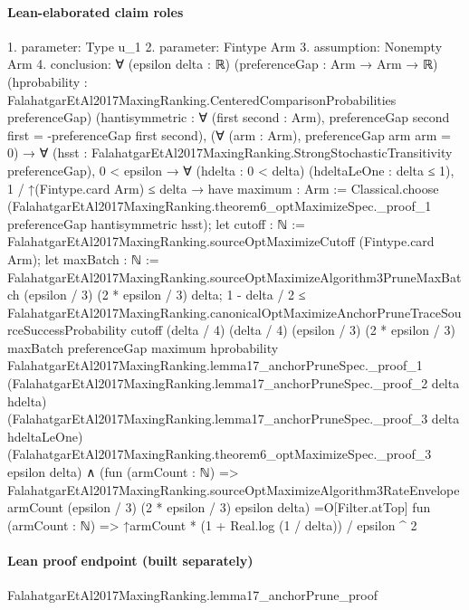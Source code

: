 \documentclass[10pt]{article}
\begin{document}
\paragraph{Lean-elaborated claim roles}\begin{ReviewVerbatim}
1. parameter: Type u_1
2. parameter: Fintype Arm
3. assumption: Nonempty Arm
4. conclusion: ∀ (epsilon delta : ℝ) (preferenceGap : Arm → Arm → ℝ)
  (hprobability : FalahatgarEtAl2017MaxingRanking.CenteredComparisonProbabilities preferenceGap)
  (hantisymmetric : ∀ (first second : Arm), preferenceGap second first = -preferenceGap first second),
  (∀ (arm : Arm), preferenceGap arm arm = 0) →
    ∀ (hsst : FalahatgarEtAl2017MaxingRanking.StrongStochasticTransitivity preferenceGap),
      0 < epsilon →
        ∀ (hdelta : 0 < delta) (hdeltaLeOne : delta ≤ 1),
          1 / ↑(Fintype.card Arm) ≤ delta →
            have maximum : Arm :=
              Classical.choose
                (FalahatgarEtAl2017MaxingRanking.theorem6_optMaximizeSpec._proof_1 preferenceGap hantisymmetric hsst);
            let cutoff : ℕ := FalahatgarEtAl2017MaxingRanking.sourceOptMaximizeCutoff (Fintype.card Arm);
            let maxBatch : ℕ :=
              FalahatgarEtAl2017MaxingRanking.sourceOptMaximizeAlgorithm3PruneMaxBatch (epsilon / 3) (2 * epsilon / 3)
                delta;
            1 - delta / 2 ≤
                FalahatgarEtAl2017MaxingRanking.canonicalOptMaximizeAnchorPruneTraceSourceSuccessProbability cutoff
                  (delta / 4) (delta / 4) (epsilon / 3) (2 * epsilon / 3) maxBatch preferenceGap maximum hprobability
                  FalahatgarEtAl2017MaxingRanking.lemma17_anchorPruneSpec._proof_1
                  (FalahatgarEtAl2017MaxingRanking.lemma17_anchorPruneSpec._proof_2 delta hdelta)
                  (FalahatgarEtAl2017MaxingRanking.lemma17_anchorPruneSpec._proof_3 delta hdeltaLeOne)
                  (FalahatgarEtAl2017MaxingRanking.theorem6_optMaximizeSpec._proof_3 epsilon delta) ∧
              (fun (armCount : ℕ) =>
                  FalahatgarEtAl2017MaxingRanking.sourceOptMaximizeAlgorithm3RateEnvelope armCount (epsilon / 3)
                    (2 * epsilon / 3) epsilon delta) =O[Filter.atTop]
                fun (armCount : ℕ) => ↑armCount * (1 + Real.log (1 / delta)) / epsilon ^ 2
\end{ReviewVerbatim}

\paragraph{Lean proof endpoint (built separately)}\begin{ReviewVerbatim}
FalahatgarEtAl2017MaxingRanking.lemma17_anchorPrune_proof
\end{ReviewVerbatim}
\end{document}
